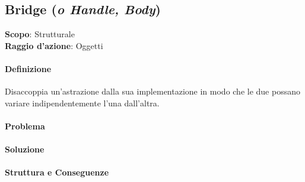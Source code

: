 \subsection{Bridge (\textit{o Handle, Body})}


\textbf{Scopo}: Strutturale \\
\textbf{Raggio d'azione}: Oggetti

\paragraph{Definizione} Disaccoppia un’astrazione dalla sua implementazione in modo che le due possano variare indipendentemente l’una dall’altra.

\paragraph{Problema}

\paragraph{Soluzione} 

\paragraph{Struttura e Conseguenze} 

\newpage